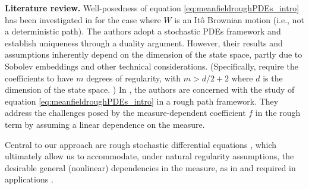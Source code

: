 \documentclass[10pt, a4paper]{article} %
\newcommand{\R}{\mathbb{R}}
\theoremstyle{definition}
\theoremstyle{plain}
\newtheorem*{assum*}{Assumptions}
\begin{document}
\textbf{Literature review. }
Well-posedness of equation \eqref{eq:meanfieldroughPDEs_intro} has been investigated in \cite{CG19} for the case where $W$ is an Itô Brownian motion (i.e., not a deterministic path).
\noindent The authors adopt a stochastic PDEs framework and establish uniqueness through a duality argument. However, their results and assumptions inherently depend on the dimension of the state space, partly due to Sobolev embeddings and other technical considerations.
(Specifically, \cite[Assumptions 5.1]{CG19} require the coefficients to have $m$ degrees of regularity, with $m>d/2+2$ where $d$ is the dimension of the state space. ) 
In \cite{CN21}, the authors are concerned with the study of equation \eqref{eq:meanfieldroughPDEs_intro} in a rough path framework. They address the challenges posed by the measure-dependent coefficient $f$ in the rough term by assuming a linear dependence on the measure. 

Central to our approach are rough stochastic differential equations \cite{FHL21, FHL25}, which ultimately allow us to accommodate, under natural regularity assumptions, the desirable general (nonlinear) dependencies in the measure, as in \cite{CG19} and required in applications \cite{CARMONADELARUE_volumeI, CARMONADELARUE_volumeII}.


\end{document}
